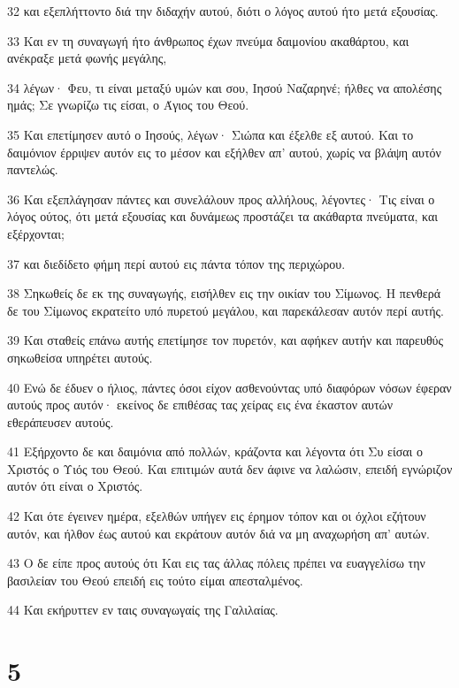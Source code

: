 \par 32 και εξεπλήττοντο διά την διδαχήν αυτού, διότι ο λόγος αυτού ήτο μετά εξουσίας.
\par 33 Και εν τη συναγωγή ήτο άνθρωπος έχων πνεύμα δαιμονίου ακαθάρτου, και ανέκραξε μετά φωνής μεγάλης,
\par 34 λέγων· Φευ, τι είναι μεταξύ υμών και σου, Ιησού Ναζαρηνέ; ήλθες να απολέσης ημάς; Σε γνωρίζω τις είσαι, ο Άγιος του Θεού.
\par 35 Και επετίμησεν αυτό ο Ιησούς, λέγων· Σιώπα και έξελθε εξ αυτού. Και το δαιμόνιον έρριψεν αυτόν εις το μέσον και εξήλθεν απ' αυτού, χωρίς να βλάψη αυτόν παντελώς.
\par 36 Και εξεπλάγησαν πάντες και συνελάλουν προς αλλήλους, λέγοντες· Τις είναι ο λόγος ούτος, ότι μετά εξουσίας και δυνάμεως προστάζει τα ακάθαρτα πνεύματα, και εξέρχονται;
\par 37 και διεδίδετο φήμη περί αυτού εις πάντα τόπον της περιχώρου.
\par 38 Σηκωθείς δε εκ της συναγωγής, εισήλθεν εις την οικίαν του Σίμωνος. Η πενθερά δε του Σίμωνος εκρατείτο υπό πυρετού μεγάλου, και παρεκάλεσαν αυτόν περί αυτής.
\par 39 Και σταθείς επάνω αυτής επετίμησε τον πυρετόν, και αφήκεν αυτήν και παρευθύς σηκωθείσα υπηρέτει αυτούς.
\par 40 Ενώ δε έδυεν ο ήλιος, πάντες όσοι είχον ασθενούντας υπό διαφόρων νόσων έφεραν αυτούς προς αυτόν· εκείνος δε επιθέσας τας χείρας εις ένα έκαστον αυτών εθεράπευσεν αυτούς.
\par 41 Εξήρχοντο δε και δαιμόνια από πολλών, κράζοντα και λέγοντα ότι Συ είσαι ο Χριστός ο Υιός του Θεού. Και επιτιμών αυτά δεν άφινε να λαλώσιν, επειδή εγνώριζον αυτόν ότι είναι ο Χριστός.
\par 42 Και ότε έγεινεν ημέρα, εξελθών υπήγεν εις έρημον τόπον και οι όχλοι εζήτουν αυτόν, και ήλθον έως αυτού και εκράτουν αυτόν διά να μη αναχωρήση απ' αυτών.
\par 43 Ο δε είπε προς αυτούς ότι Και εις τας άλλας πόλεις πρέπει να ευαγγελίσω την βασιλείαν του Θεού επειδή εις τούτο είμαι απεσταλμένος.
\par 44 Και εκήρυττεν εν ταις συναγωγαίς της Γαλιλαίας.

\chapter{5}

